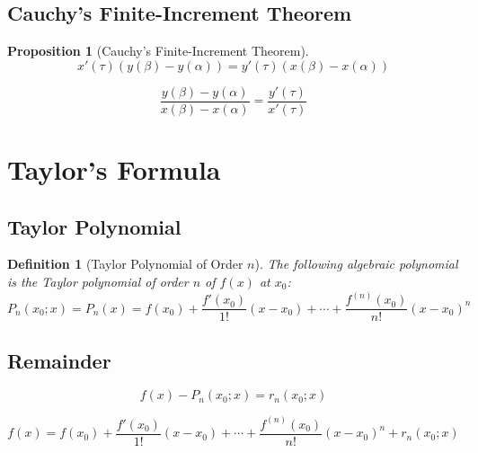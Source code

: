 \documentclass[onecolumn]{ctexart}
\newtheorem{definition}{Definition}
\newtheorem{proposition}{Proposition}
\begin{document}
\subsection{Cauchy's Finite-Increment Theorem}

\begin{proposition}[Cauchy's Finite-Increment Theorem]
  \begin{equation}
    x'(\tau)(y(\beta) - y(\alpha)) = y'(\tau)(x(\beta) - x(\alpha))
  \end{equation}

  \begin{equation}
    \frac{y(\beta) - y(\alpha)}{x(\beta) - x(\alpha)} = \frac{y'(\tau)}{x'(\tau)}
  \end{equation}
\end{proposition}

\section{Taylor's Formula}

\subsection{Taylor Polynomial}

\begin{definition}[Taylor Polynomial of Order $n$]
  The following algebraic polynomial is the Taylor polynomial of order $n$ of 
  $f(x)$ at $x_0$:
  \begin{equation}
    P_n(x_0; x) = P_n(x) = f(x_0) + \frac{f'(x_0)}{1!}(x - x_0) + \cdots + \frac{f^{(n)}(x_0)}{n!}(x - x_0)^n
  \end{equation}
\end{definition}

\subsection{Remainder}

\begin{equation}
  f(x) - P_n(x_0; x) = r_n(x_0; x)
\end{equation}

\begin{equation}
  f(x) = f(x_0) + \frac{f'(x_0)}{1!}(x - x_0) + \cdots + \frac{f^{(n)}(x_0)}{n!}(x - x_0)^n + r_n(x_0; x)
\end{equation}
\end{document}

